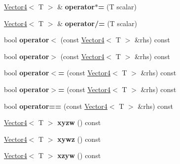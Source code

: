 \begin{DoxyCompactItemize}
\mbox{\hyperlink{class_vector4}{Vector4}}$<$ T $>$ \& {\bfseries operator$\ast$=} (T scalar)
\item 
\mbox{\label{class_vector4_a566b4c05fada0fe8823c56f6d407fb25}} 
\mbox{\hyperlink{class_vector4}{Vector4}}$<$ T $>$ \& {\bfseries operator/=} (T scalar)
\item 
\mbox{\label{class_vector4_a089d05a63badd584f1ec737f0a0cd192}} 
bool {\bfseries operator$<$} (const \mbox{\hyperlink{class_vector4}{Vector4}}$<$ T $>$ \&rhs) const
\item 
\mbox{\label{class_vector4_abb9410703aa2cd16a1eebdc8455b3684}} 
bool {\bfseries operator$>$} (const \mbox{\hyperlink{class_vector4}{Vector4}}$<$ T $>$ \&rhs) const
\item 
\mbox{\label{class_vector4_a28a0678b1053a1854a15046a369dcb8d}} 
bool {\bfseries operator$<$=} (const \mbox{\hyperlink{class_vector4}{Vector4}}$<$ T $>$ \&rhs) const
\item 
\mbox{\label{class_vector4_a775421e83f0bdf6cf96e9cd936e7cb38}} 
bool {\bfseries operator$>$=} (const \mbox{\hyperlink{class_vector4}{Vector4}}$<$ T $>$ \&rhs) const
\item 
\mbox{\label{class_vector4_ab25cd3a793ef8f07c92fae01a94e7967}} 
bool {\bfseries operator==} (const \mbox{\hyperlink{class_vector4}{Vector4}}$<$ T $>$ \&rhs) const
\item 
\mbox{\label{class_vector4_a0d500980b978b94728d6eefe536aa4eb}} 
\mbox{\hyperlink{class_vector4}{Vector4}}$<$ T $>$ {\bfseries xyzw} () const
\item 
\mbox{\label{class_vector4_ac919172fd134566a36b6ee1fb56ff2c3}} 
\mbox{\hyperlink{class_vector4}{Vector4}}$<$ T $>$ {\bfseries xywz} () const
\item 
\mbox{\label{class_vector4_a706593d979b9a4265eeb4c9659dcfa27}} 
\mbox{\hyperlink{class_vector4}{Vector4}}$<$ T $>$ {\bfseries xzyw} () const
\item 
\mbox{\label{class_vector4_a7c2c94c8c945e72f80891cd90a7efceb}} 

\end{DoxyCompactItemize}
